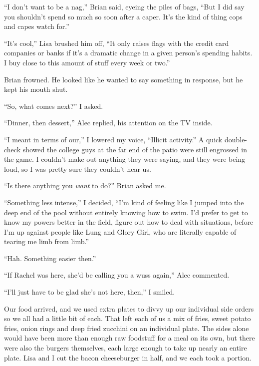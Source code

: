 ``I don't want to be a nag,'' Brian said, eyeing the piles of bags, ``But I did say you shouldn't spend so much so soon after a caper.  It's the kind of thing cops and capes watch for.''



``It's cool,'' Lisa brushed him off, ``It only raises flags with the credit card companies or banks if it's a dramatic change in a given person's spending habits.  I buy close to this amount of stuff every week or two.''



Brian frowned.  He looked like he wanted to say something in response, but he kept his mouth shut.



``So, what comes next?'' I asked.



``Dinner, then dessert,'' Alec replied, his attention on the TV inside.



``I meant in terms of our,'' I lowered my voice, ``Illicit activity.''  A quick double-check showed the college guys at the far end of the patio were still engrossed in the game.  I couldn't make out anything they were saying, and they were being loud, so I was pretty sure they couldn't hear us.



``Is there anything you \emph{want} to do?'' Brian asked me.



``Something less intense,'' I decided, ``I'm kind of feeling like I jumped into the deep end of the pool without entirely knowing how to swim.  I'd prefer to get to know my powers better in the field, figure out how to deal with situations, before I'm up against people like Lung and Glory Girl, who are literally capable of tearing me limb from limb.''



``Hah.  Something easier then.''



``If Rachel was here, she'd be calling you a wuss again,'' Alec commented.



``I'll just have to be glad she's not here, then,'' I smiled.



Our food arrived, and we used extra plates to divvy up our individual side orders so we all had a little bit of each.  That left each of us a mix of fries, sweet potato fries, onion rings and deep fried zucchini on an individual plate.  The sides alone would have been more than enough raw foodstuff for a meal on its own, but there were also the burgers themselves, each large enough to take up nearly an entire plate.  Lisa and I cut the bacon cheeseburger in half, and we each took a portion.



